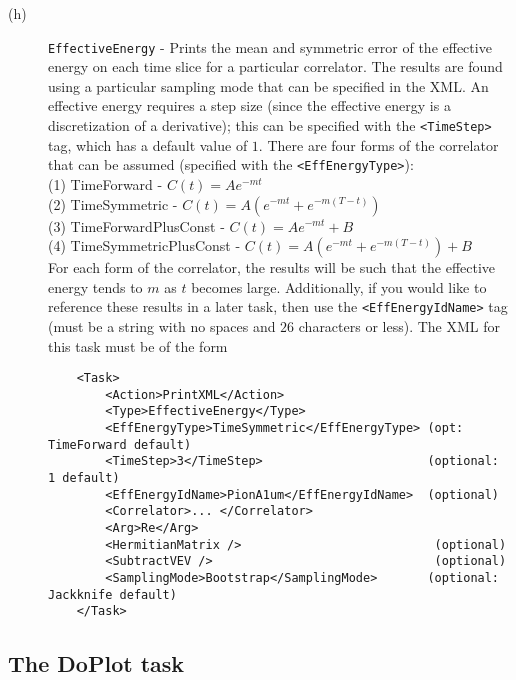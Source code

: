 \documentclass[12pt]{article}
\newcommand{\vb}{\texttt}
\begin{document}
\begin{description}
\item[(h)] \vb{EffectiveEnergy} - Prints the mean and symmetric error of
the effective energy on each time slice for a
particular correlator. The results are found using a particular sampling mode
that can be specified in the XML.
An effective energy requires a step size (since the effective energy
is a discretization of a derivative); this can be specified with
the \vb{<TimeStep>} tag, which has a default value of $1$.
There are four forms of the correlator that
can be assumed (specified with the \vb{<EffEnergyType>}): \\
\hspace*{15pt} (1) TimeForward - $C(t) = A e^{-m t}$ \\
\hspace*{15pt} (2) TimeSymmetric - $C(t) = A ( e^{-m t} + e^{-m (T-t)})$ \\
\hspace*{15pt} (3) TimeForwardPlusConst - $C(t) = A e^{-m t} + B$ \\
\hspace*{15pt} (4) TimeSymmetricPlusConst - $C(t) = A ( e^{-m t} + e^{-m (T-t)}) + B$ \\
For each form of the correlator, the results will be such that
the effective energy tends to $m$ as $t$ becomes large.
Additionally, if you would like to reference these results in a later task, then
use the \vb{<EffEnergyIdName>} tag (must be a string with no spaces and $26$ characters
or less). The XML for this task must be of the form
\begin{verbatim}
    <Task>
        <Action>PrintXML</Action>
        <Type>EffectiveEnergy</Type>
        <EffEnergyType>TimeSymmetric</EffEnergyType> (opt: TimeForward default)
        <TimeStep>3</TimeStep>                       (optional: 1 default)
        <EffEnergyIdName>PionA1um</EffEnergyIdName>  (optional)
        <Correlator>... </Correlator> 
        <Arg>Re</Arg>
        <HermitianMatrix />                           (optional)
        <SubtractVEV />                               (optional)
        <SamplingMode>Bootstrap</SamplingMode>       (optional: Jackknife default)
    </Task>   
\end{verbatim}
\end{description}

\subsection{The DoPlot task}
\end{document}
